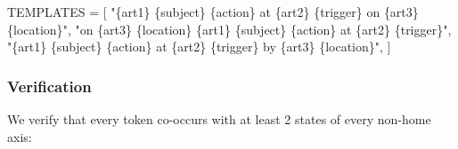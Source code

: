 \documentclass[
  twocolumn,
  10pt,
  a4paper]{article}
\newenvironment{Shaded}{}{}
\newcommand{\NormalTok}[1]{#1}
\newcommand{\OperatorTok}[1]{\textcolor[rgb]{0.40,0.40,0.40}{#1}}
\newcommand{\SpecialCharTok}[1]{\textcolor[rgb]{0.25,0.44,0.63}{#1}}
\newcommand{\StringTok}[1]{\textcolor[rgb]{0.25,0.44,0.63}{#1}}
\begin{document}
\begin{Shaded}
\begin{Highlighting}[]
\NormalTok{TEMPLATES }\OperatorTok{=}\NormalTok{ [}
    \StringTok{"}\SpecialCharTok{\{art1\}}\StringTok{ }\SpecialCharTok{\{subject\}}\StringTok{ }\SpecialCharTok{\{action\}}\StringTok{ at }\SpecialCharTok{\{art2\}}\StringTok{ }\SpecialCharTok{\{trigger\}}\StringTok{ on }\SpecialCharTok{\{art3\}}\StringTok{ }\SpecialCharTok{\{location\}}\StringTok{"}\NormalTok{,}
    \StringTok{"on }\SpecialCharTok{\{art3\}}\StringTok{ }\SpecialCharTok{\{location\}}\StringTok{ }\SpecialCharTok{\{art1\}}\StringTok{ }\SpecialCharTok{\{subject\}}\StringTok{ }\SpecialCharTok{\{action\}}\StringTok{ at }\SpecialCharTok{\{art2\}}\StringTok{ }\SpecialCharTok{\{trigger\}}\StringTok{"}\NormalTok{,}
    \StringTok{"}\SpecialCharTok{\{art1\}}\StringTok{ }\SpecialCharTok{\{subject\}}\StringTok{ }\SpecialCharTok{\{action\}}\StringTok{ at }\SpecialCharTok{\{art2\}}\StringTok{ }\SpecialCharTok{\{trigger\}}\StringTok{ by }\SpecialCharTok{\{art3\}}\StringTok{ }\SpecialCharTok{\{location\}}\StringTok{"}\NormalTok{,}
\NormalTok{]}
\end{Highlighting}
\end{Shaded}

\hypertarget{verification}{%
\subsubsection{Verification}\label{verification}}

We verify that every token co-occurs with at least 2 states of every
non-home axis:
\end{document}
